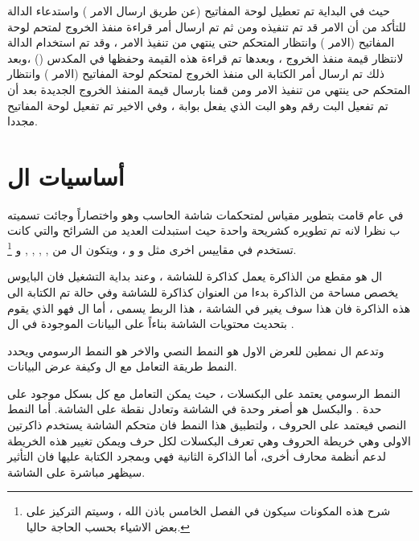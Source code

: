 \documentclass[document.tex]{subfiles}
\begin{document}
حيث في البداية تم تعطيل لوحة المفاتيح (عن طريق ارسال الامر ) واستدعاء الدالة  للتأكد من أن الامر قد تم تنفيذه ومن ثم تم ارسال أمر قراءة منفذ الخروج لمتحم لوحة المفاتيح (الامر ) وانتظار المتحكم حتى ينتهي من تنفيذ الامر ، وقد تم استخدام الدالة  لانتظار قيمة منفذ الخروج ، وبعدها تم قراءة هذه القيمة وحفظها في المكدس () ،وبعد ذلك تم ارسال أمر الكتابة الى منفذ الخروج لمتحكم لوحة المفاتيح (الامر ) وانتظار المتحكم حى ينتهي من تنفيذ الامر ومن قمنا بارسال قيمة المنفذ الخروج الجديدة بعد أن تم تفعيل البت رقم  وهو البت الذي يفعل بوابة  ، وفي الاخير تم تفعيل لوحة المفاتيح مجددا.
 

\section{أساسيات ال }
في عام  قامت  بتطوير مقياس لمتحكمات شاشة الحاسب وهو  واختصاراً  وجائت تسميته ب  نظرا لانه تم تطويره كشريحة واحدة  حيث استبدلت العديد من الشرائح والتي كانت تستخدم في مقاييس اخرى مثل  و  و  ، ويتكون ال  من ,  ,  ,  ,  و \footnote{شرح هذه المكونات سيكون في الفصل الخامس باذن الله ، وسيتم التركيز على بعض الاشياء بحسب الحاجة حاليا.}.

ال  هو مقطع من الذاكرة  يعمل كذاكرة للشاشة  ، وعند بداية التشغيل فان البايوس يخصص مساحة من الذاكرة بدءا من العنوان  كذاكرة للشاشة وفي حالة تم الكتابة الى هذه الذاكرة فان هذا سوف يغير في الشاشة ، هذا الربط يسمى ، أما ال  فهو الذي يقوم بتحديث محتويات الشاشة بناءاً على البيانات الموجودة في ال .
 
وتدعم ال  نمطين للعرض الاول هو النمط النصي  والاخر هو النمط الرسومي  ويحدد النمط طريقة التعامل مع ال  وكيفة عرض البيانات.

النمط الرسومي  يعتمد على البكسلات ، حيث يمكن التعامل مع كل بسكل موجود على حدة . والبكسل هو أصغر وحدة في الشاشة وتعادل نقطة على الشاشة. أما النمط النصي  فيعتمد على الحروف  ، ولتطبيق هذا النمط فان متحكم الشاشة  يستخدم ذاكرتين  الاولى وهي خريطة الحروف  وهي تعرف البكسلات لكل حرف ويمكن تغيير هذه الخريطة لدعم أنظمة محارف أخرى، أما الذاكرة الثانية فهي وبمجرد الكتابة عليها فان التأثير سيظهر مباشرة على الشاشة.
\end{document}
